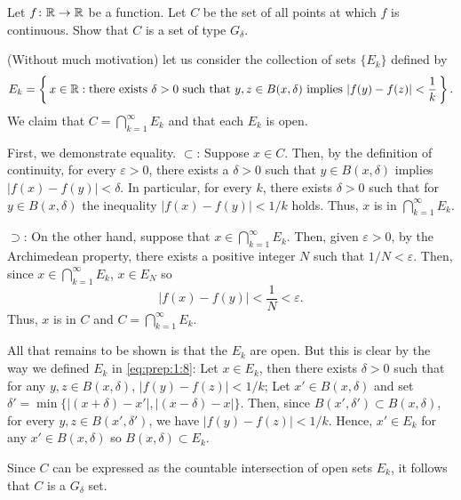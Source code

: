 \begin{problem}
  Let $f\colon\mathbb{R}\to\mathbb{R}$ be a function. Let $C$ be the set of all points
  at which $f$ is continuous. Show that $C$ is a set of type $G_\delta$.
\end{problem}
\begin{solution}
  (Without much motivation) let us consider the collection of sets
  $\{E_k\}$ defined by
  \begin{equation}
    \label{eq:prep:1:8}
    E_k=\left\{\,x\in\mathbb{R}:
      \text{there exists $\delta>0$ such that $y,z\in B(x,\delta)$ implies $\left|f(y)-f(z)\right|<\frac{1}{k}$}\,\right\}.
  \end{equation}
  We claim that $C=\bigcap_{k=1}^\infty E_k$ and that each $E_k$ is open.
  \begin{solution}
    \renewcommand{\qedsymbol}{$\clubsuit$} First, we demonstrate
    equality. $\subset$: Suppose $x\in C$. Then, by the definition of
    continuity, for every $\varepsilon>0$, there exists a $\delta>0$ such
    that $y\in B(x,\delta)$ implies $|f(x)-f(y)|<\delta$. In particular,
    for every $k$, there exists $\delta>0$ such that for $y\in B(x,\delta)$
    the inequality $|f(x)-f(y)|<1/k$ holds. Thus, $x$ is in
    $\bigcap_{k=1}^\infty E_k$.

    $\supset$: On the other hand, suppose that
    $x\in\bigcap_{k=1}^\infty E_k$. Then, given $\varepsilon>0$, by the
    Archimedean property, there exists a positive integer $N$ such that
    $1/N<\varepsilon$. Then, since $x\in\bigcap_{k=1}^\infty E_k$,
    $x\in E_N$ so
    \begin{equation}
      \label{eq:prep:1:9}
      |f(x)-f(y)|<\frac{1}{N}<\varepsilon.
    \end{equation}
    Thus, $x$ is in $C$ and $C=\bigcap_{k=1}^\infty E_k$.

    All that remains to be shown is that the $E_k$ are open. But this is
    clear by the way we defined $E_k$ in \eqref{eq:prep:1:8}: Let
    $x\in E_k$, then there exists $\delta>0$ such that for any
    $y,z\in B(x,\delta)$, $|f(y)-f(z)|<1/k$; Let $x'\in B(x,\delta)$ and
    set $\delta'=\min\{|(x+\delta)-x'|,|(x-\delta)-x|\}$. Then, since
    $B(x',\delta')\subset B(x,\delta)$, for every $y,z\in B(x',\delta')$,
    we have $|f(y)-f(z)|<1/k$. Hence, $x'\in E_k$ for any
    $x'\in B(x,\delta)$ so $B(x,\delta)\subset E_k$.
  \end{solution}
  Since $C$ can be expressed as the countable intersection of open sets
  $E_k$, it follows that $C$ is a $G_\delta$ set.
\end{solution}
